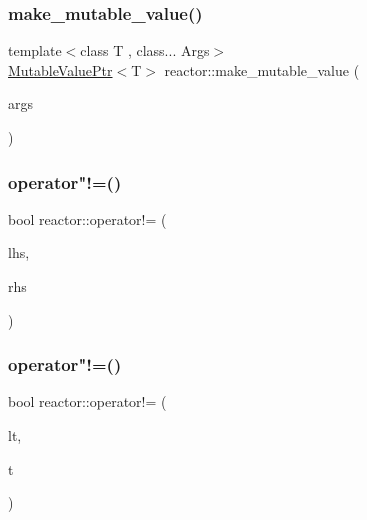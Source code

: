\subsubsection{\texorpdfstring{make\+\_\+mutable\+\_\+value()}{make\_mutable\_value()}}
{\footnotesize\ttfamily template$<$class T , class... Args$>$ \\
\hyperlink{classreactor_1_1MutableValuePtr}{Mutable\+Value\+Ptr}$<$T$>$ reactor\+::make\+\_\+mutable\+\_\+value (\begin{DoxyParamCaption}\item[{Args \&\&...}]{args }\end{DoxyParamCaption})}

\mbox{\label{namespacereactor_a550a07297e731136c8d7570395c5128d}} 
\subsubsection{\texorpdfstring{operator"!=()}{operator!=()}\hspace{0.1cm}{\footnotesize\ttfamily [1/11]}}
{\footnotesize\ttfamily bool reactor\+::operator!= (\begin{DoxyParamCaption}\item[{const \hyperlink{classreactor_1_1Tag}{Tag} \&}]{lhs,  }\item[{const \hyperlink{classreactor_1_1Tag}{Tag} \&}]{rhs }\end{DoxyParamCaption})\hspace{0.3cm}{\ttfamily [inline]}}

\mbox{\label{namespacereactor_a127aac66cd5fa1913c6756d46be9d817}} 
\subsubsection{\texorpdfstring{operator"!=()}{operator!=()}\hspace{0.1cm}{\footnotesize\ttfamily [2/11]}}
{\footnotesize\ttfamily bool reactor\+::operator!= (\begin{DoxyParamCaption}\item[{const \hyperlink{classreactor_1_1LogicalTime}{Logical\+Time} \&}]{lt,  }\item[{const \hyperlink{classreactor_1_1Tag}{Tag} \&}]{t }\end{DoxyParamCaption})\hspace{0.3cm}{\ttfamily [inline]}}


